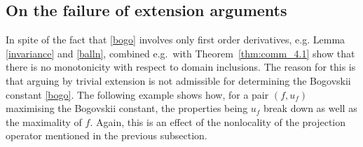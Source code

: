 \documentclass[11pt]{article}
\theoremstyle{plain}
\theoremstyle{definition}
\numberwithin{equation}{section}
\begin{document}
\begin{appendix}
\subsection{On the failure of extension arguments}
\label{sec:nonmonotonicity}

In spite of the fact that \eqref{bogo} involves only first order derivatives, e.g. Lemma \ref{invariance} and \eqref{balln}, {combined e.g.\
with Theorem~\ref{thm:comm_4.1}} show that there is no monotonicity with respect to domain inclusions.
The reason for this is that arguing by trivial extension is not admissible for determining the Bogovskii constant \eqref{bogo}.
The following example shows how, for a pair $(f,u_f)$ maximising the Bogovskii constant, the properties being $u_f$ break down as well as
the maximality of $f$. Again, this is an effect of the nonlocality of the projection operator mentioned in the previous subsection.



\end{appendix}
\end{document}
